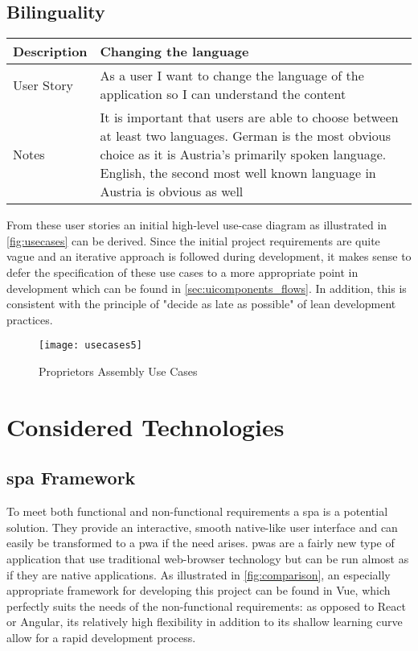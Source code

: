 \subsection{Bilinguality}
\begin{table}[H]
  \begin{tabularx}{\linewidth}{l|X}
     Description & Changing the language \\
     \hline
     User Story & As a user I want to change the language of the application so I can understand the content \\
     \hline
     Notes & It is important that users are able to choose between at least two languages. German is the most obvious choice as it is Austria's primarily spoken language. English, the second most well known language in Austria is obvious as well 
  \end{tabularx}
\end{table}

From these user stories an initial high-level use-case diagram as illustrated in \autoref{fig:usecases} can be derived. Since the initial project requirements are quite vague and an iterative approach is followed during development, it makes sense to defer the specification of these use cases to a more appropriate point in development which can be found in \autoref{sec:uicomponents_flows}. In addition, this is consistent with the principle of "decide as late as possible" of lean development practices.

\begin{figure}[H]
    \begin{center}
    \texttt{[image: usecases5]}
    \end{center}
    \caption{Proprietors Assembly Use Cases}
    \label{fig:usecases}
\end{figure}

\section{Considered Technologies} \label{sec:consideredtech}
\subsection{\acrshort{spa} Framework}
To meet both functional and non-functional requirements a \acrfull{spa} is a potential solution. They provide an interactive, smooth native-like user interface and can easily be transformed to a \acrfull{pwa} if the need arises. \acrshort{pwa}s are a fairly new type of application that use traditional web-browser technology but can be run almost as if they are native applications. As illustrated in \autoref{fig:comparison}, an especially appropriate framework for developing this project can be found in Vue, which perfectly suits the needs of the non-functional requirements: as opposed to React or Angular, its relatively high flexibility in addition to its shallow learning curve allow for a rapid development process.

